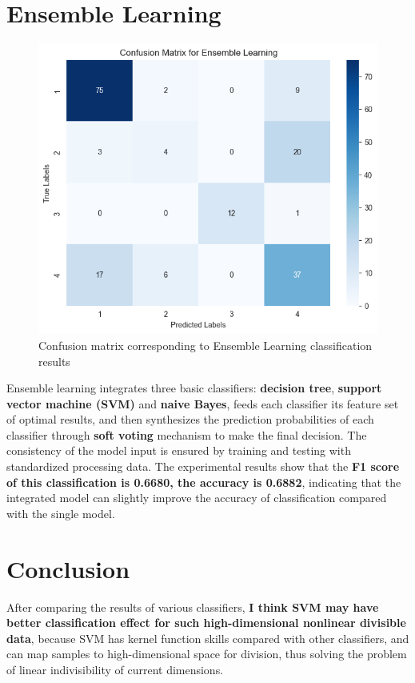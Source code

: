 \documentclass[twocolumn]{IEEEtran}
\begin{document}
\section{Ensemble Learning}
\begin{figure}[H]
    \centering %
    \includegraphics[scale=0.3]{./img/el_matrix.png}
    \caption{Confusion matrix corresponding to Ensemble Learning classification results}
\end{figure}

Ensemble learning integrates three basic classifiers: \textbf{decision tree}, \textbf{support vector machine (SVM)} and \textbf{naive Bayes}, feeds each classifier its feature set of optimal results, and then synthesizes the prediction probabilities of each classifier through \textbf{soft voting} mechanism to make the final decision. The consistency of the model input is ensured by training and testing with standardized processing data. The experimental results show that the \textbf{F1 score of this classification is 0.6680, the accuracy is 0.6882}, indicating that the integrated model can slightly improve the accuracy of classification compared with the single model.

\section{Conclusion}
After comparing the results of various classifiers, \textbf{I think SVM may have better classification effect for such high-dimensional nonlinear divisible data}, because SVM has kernel function skills compared with other classifiers, and can map samples to high-dimensional space for division, thus solving the problem of linear indivisibility of current dimensions.
\end{document}
